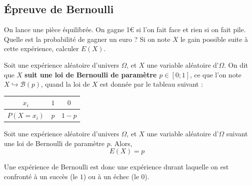 \documentclass{poly}
\begin{document}
\subsection{Épreuve de Bernoulli}
\begin{example}
On lance une pièce équilibrée. On gagne 1€ si l'on fait face et rien si on fait pile. Quelle est la probabilité de gagner un euro ? Si on note $X$ le gain possible suite à cette expérience, calculer $E(X)$.

\end{example}
\begin{definition}
Soit une expérience aléatoire d'univers $\Omega$, et $X$ une variable aléatoire d'$\Omega$. On dit que $X$ \textbf{suit une loi de Bernoulli de paramètre $p \in [0;1]$}, ce que l'on note $X \hookrightarrow \mathcal{B}(p)$, quand la loi de $X$ est donnée par le tableau suivant :
\begin{center}
\begin{tabular}{|c|c|c|}
\hline
$x_i$&$1$&$0$\\
\hline
$P(X = x_i)$&$p$&$1 - p$\\
\hline
\end{tabular}
\end{center}
\end{definition}
\begin{proposition}
Soit une expérience aléatoire d'univers $\Omega$, et $X$ une variable aléatoire d'$\Omega$ suivant une loi de Bernoulli de paramètre $p$. Alors,
\begin{equation*}
E(X) = p
\end{equation*}
\end{proposition}
\begin{remark}
Une expérience de Bernoulli est donc une expérience durant laquelle on est confronté à un succès (le $1$) ou à un échec (le $0$).
\end{remark}
\end{document}
